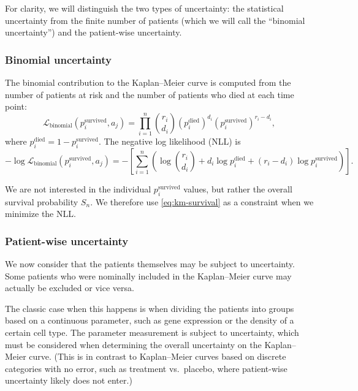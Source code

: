 \documentclass[article]{jss}
\newcommand{\KM}{Kaplan--Meier} %
\begin{document}
For clarity, we will distinguish the two types of uncertainty: the statistical uncertainty from the finite number of patients (which we will call the ``binomial uncertainty'') and the patient-wise uncertainty.

\subsubsection{Binomial uncertainty}\label{sec:binomial-uncertainty}

The binomial contribution to the \KM{} curve is computed from the number of patients at risk and the number of patients who died at each time point:
\begin{equation}
\mathcal{L}_{\text{binomial}}(p_i^\text{survived}, a_j) = \prod_{i=1}^{n} \binom{r_i}{d_i} {\left(p_i^\text{died}\right)}^{d_i} {\left(p_i^\text{survived}\right)}^{r_i-d_i},
\end{equation}
where \(p_i^\text{died} = 1 - p_i^\text{survived}\). The negative log likelihood (NLL) is
\begin{equation}
-\log \mathcal{L}_{\text{binomial}}(p_i^\text{survived}, a_j) = -\left[\sum_{i=1}^{n} \left( \log\binom{r_i}{d_i} + d_i \log p_i^\text{died} + (r_i-d_i) \log p_i^\text{survived} \right)\right]. \label{eq:binomial-nll}
\end{equation}

We are not interested in the individual \(p_i^\text{survived}\) values, but rather the overall survival probability \(S_n\). We therefore use \cref{eq:km-survival} as a constraint when we minimize the NLL\@.

\subsubsection{Patient-wise uncertainty}\label{sec:patient-wise-uncertainty}

We now consider that the patients themselves may be subject to uncertainty. Some patients who were nominally included in the \KM{} curve may actually be excluded or vice versa.

The classic case when this happens is when dividing the patients into groups based on a continuous parameter, such as gene expression or the density of a certain cell type. The parameter measurement is subject to uncertainty, which must be considered when determining the overall uncertainty on the \KM{} curve. (This is in contrast to \KM{} curves based on discrete categories with no error, such as treatment vs.\ placebo, where patient-wise uncertainty likely does not enter.)
\end{document}
